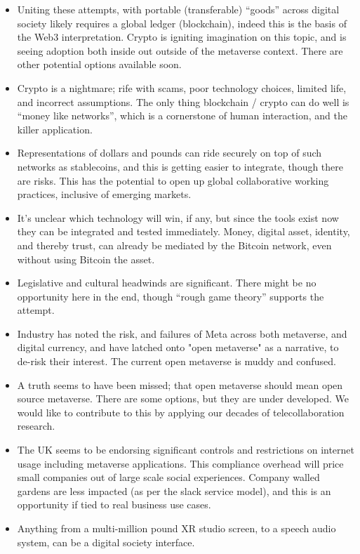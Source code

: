 \begin{itemize}
\item Uniting these attempts, with portable (transferable) ``goods'' across digital society likely requires a global ledger (blockchain), indeed this is the basis of the Web3 interpretation. Crypto is igniting imagination on this topic, and is seeing adoption both inside out outside of the metaverse context. There are other potential options available soon.
\item Crypto is a nightmare; rife with scams, poor technology choices, limited life, and incorrect assumptions. The only thing blockchain / crypto can do well is ``money like networks'', which is a cornerstone of human interaction, and the killer application.
\item Representations of dollars and pounds can ride securely on top of such networks as stablecoins, and this is getting easier to integrate, though there are risks. This has the potential to open up global collaborative working practices, inclusive of emerging markets.
\item It's unclear which technology will win, if any, but since the tools exist now they can be integrated and tested immediately. Money, digital asset, identity, and thereby trust, can already be mediated by the Bitcoin network, even without using Bitcoin the asset. 
\item Legislative and cultural headwinds are significant. There might be no opportunity here in the end, though ``rough game theory'' supports the attempt.
\item Industry has noted the risk, and failures of Meta across both metaverse, and digital currency, and have latched onto "open metaverse" as a narrative, to de-risk their interest. The current open metaverse is muddy and confused. 
\item A truth seems to have been missed; that open metaverse should mean open source metaverse. There are some options, but they are under developed. We would like to contribute to this by applying our decades of telecollaboration research. 
\item The UK seems to be endorsing significant controls and restrictions on internet usage including metaverse applications. This compliance overhead will price small companies out of large scale social experiences. Company walled gardens are less impacted (as per the slack service model), and this is an opportunity if tied to real business use cases.
\item Anything from a multi-million pound XR studio screen, to a speech audio system, can be a digital society interface.

\end{itemize}
